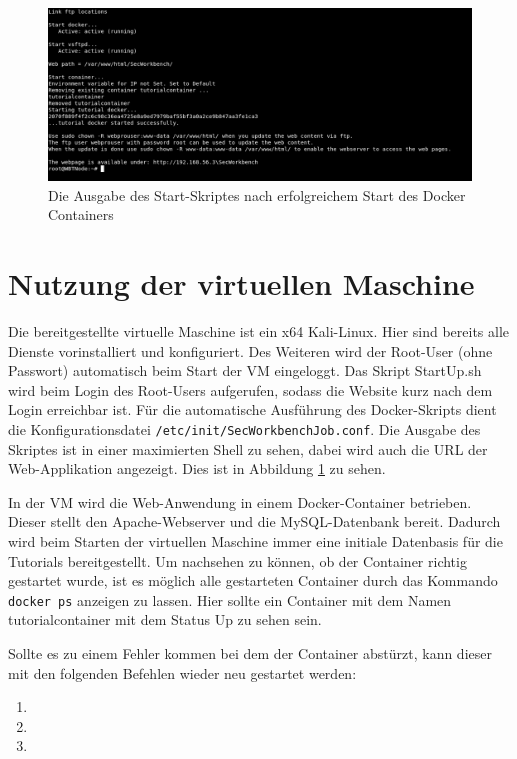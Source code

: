 \begin{figure}[H]
	\centering
	\includegraphics[width=\textwidth]{images/Installation/startUp.png}
	\caption{Die Ausgabe des Start-Skriptes nach erfolgreichem Start des Docker Containers}
	\label{fig:startUp}
\end{figure}

\section{Nutzung der virtuellen Maschine}

Die bereitgestellte virtuelle Maschine ist ein x64 Kali-Linux. Hier sind bereits alle Dienste vorinstalliert und konfiguriert. Des Weiteren wird der Root-User (ohne Passwort) automatisch beim Start der VM eingeloggt. Das Skript StartUp.sh wird beim Login des Root-Users aufgerufen, sodass die Website kurz nach dem Login erreichbar ist. Für die automatische Ausführung des Docker-Skripts dient die Konfigurationsdatei  \colorbox{altgray}{\lstinline|/etc/init/SecWorkbenchJob.conf|}. Die Ausgabe des Skriptes ist in einer maximierten Shell zu sehen, dabei wird auch die URL der Web-Applikation angezeigt. Dies ist in Abbildung \ref{fig:startUp} zu sehen.\medskip

In der VM wird die Web-Anwendung in einem Docker-Container betrieben. Dieser stellt den Apache-Webserver und die MySQL-Datenbank bereit. Dadurch wird beim Starten der virtuellen Maschine immer eine initiale Datenbasis für die Tutorials bereitgestellt. Um nachsehen zu können, ob der Container richtig gestartet wurde, ist es möglich alle gestarteten Container durch das Kommando \colorbox{altgray}{\lstinline|docker ps|} anzeigen zu lassen. Hier sollte ein Container mit dem Namen tutorialcontainer mit dem Status Up zu sehen sein.\newpage

Sollte es zu einem Fehler kommen bei dem der Container abstürzt, kann dieser mit den folgenden Befehlen wieder neu gestartet werden:

\begin{enumerate}
	\item {}
	\item {}
	\item {}
\end{enumerate}

